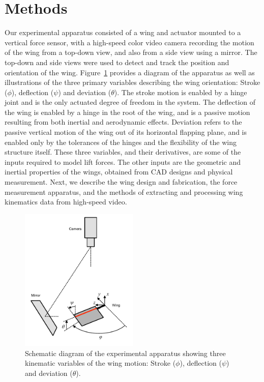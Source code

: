 \documentclass{article}
\begin{document}
\section*{Methods}
Our experimental apparatus consisted of a wing and actuator mounted to a
vertical force sensor, with a high-speed color video camera recording the motion
of the wing from a top-down view, and also from a side view using a mirror. The
top-down and side views were used to detect and track the position and
orientation of the wing.  Figure~\ref{fig:apparatus} provides a diagram of the
apparatus as well as illustrations of the three primary variables describing the
wing orientation: Stroke ($\phi$), deflection ($\psi$) and deviation ($\theta$).
The stroke motion is enabled by a hinge joint and is the only actuated degree of
freedom in the system. The deflection of the wing is enabled by a hinge in the
root of the wing, and is a passive motion resulting from both inertial and
aerodynamic effects. Deviation refers to the passive vertical motion of the wing
out of its horizontal flapping plane, and is enabled only by the tolerances of
the hinges and the flexibility of the wing structure itself. These three
variables, and their derivatives, are some of the inputs required to model lift
forces. The other inputs are the geometric and inertial properties of the wings,
obtained from CAD designs and physical measurement. Next, we describe the wing
design and fabrication, the force measurement apparatus, and the methods of
extracting and processing wing kinematics data from high-speed video.


\begin{figure}
\centering
\includegraphics[trim=0 15 0 5, clip, width=0.5\textwidth]{figures/apparatus}
\caption{Schematic diagram of the experimental apparatus
  showing three kinematic variables of the wing motion: Stroke ($\phi$),
  deflection ($\psi$) and deviation ($\theta$).\label{fig:apparatus}}
\end{figure}
\end{document}
